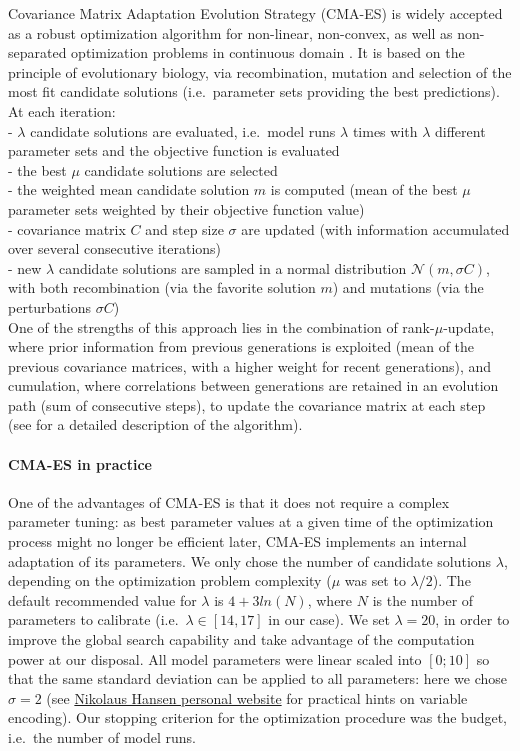 Covariance Matrix Adaptation Evolution Strategy (CMA-ES) is widely
accepted as a robust optimization algorithm for non-linear, non-convex,
as well as non-separated optimization problems in continuous domain
\citep{Hansen1996, Hansen2001, Hansen2006}. It is based on the
principle of evolutionary biology, via recombination, mutation and
selection of the most fit candidate solutions (i.e.~parameter sets
providing the best predictions). At each iteration:\\
- \(\lambda\) candidate solutions are evaluated, i.e.~model runs
\(\lambda\) times with \(\lambda\) different parameter sets and the
objective function is evaluated\\
- the best \(\mu\) candidate solutions are selected\\
- the weighted mean candidate solution \(m\) is computed (mean of the
best \(\mu\) parameter sets weighted by their objective function
value)\\
- covariance matrix \(C\) and step size \(\sigma\) are updated (with
information accumulated over several consecutive iterations)\\
- new \(\lambda\) candidate solutions are sampled in a normal
distribution \(\mathcal{N}(m, \sigma C)\), with both recombination (via
the favorite solution \(m\)) and mutations (via the perturbations
\(\sigma C\))\\
One of the strengths of this approach lies in the combination of
rank-\(\mu\)-update, where prior information from previous generations
is exploited (mean of the previous covariance matrices, with a higher
weight for recent generations), and cumulation, where correlations
between generations are retained in an evolution path (sum of
consecutive steps), to update the covariance matrix at each step (see
\citealp{Hansen2016} for a detailed
description of the algorithm).

\paragraph{CMA-ES in practice}\label{cma-es-in-practice}

One of the advantages of CMA-ES is that it does not require a complex
parameter tuning: as best parameter values at a given time of the
optimization process might no longer be efficient later, CMA-ES
implements an internal adaptation of its parameters. We only chose the
number of candidate solutions \(\lambda\), depending on the optimization
problem complexity (\(\mu\) was set to \(\lambda/2\)). The default
recommended value for \(\lambda\) is \(4 + 3 ln(N)\), where \(N\) is the
number of parameters to calibrate (i.e.~\(\lambda \in [14,17]\) in our
case). We set \(\lambda = 20\), in order to improve the global search
capability \citep{Hansen2004} and
take advantage of the computation power at our disposal. All model
parameters were linear scaled into \([0;10]\) so that the same standard
deviation can be applied to all parameters: here we chose \(\sigma = 2\)
(see
\href{https://cma-es.github.io/cmaes_sourcecode_page.html\#practical}{Nikolaus
Hansen personal website} for practical hints on variable encoding). Our
stopping criterion for the optimization procedure was the budget,
i.e.~the number of model runs.

